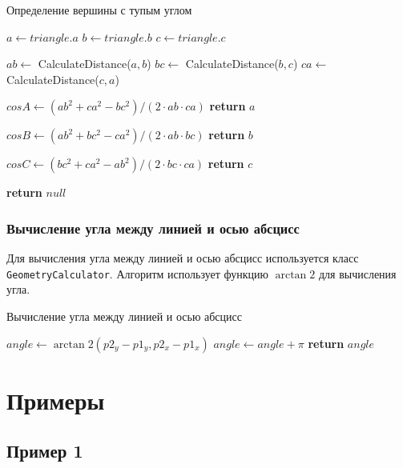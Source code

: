\documentclass[a4paper,12pt]{article}
\begin{document}
\begin{algorithm}
\caption{Определение вершины с тупым углом}
\begin{algorithmic}[1]
    \State $a \gets triangle.a$
    \State $b \gets triangle.b$
    \State $c \gets triangle.c$
    
    \State $ab \gets$ CalculateDistance($a, b$)
    \State $bc \gets$ CalculateDistance($b, c$)
    \State $ca \gets$ CalculateDistance($c, a$)
    
    \State $cosA \gets (ab^2 + ca^2 - bc^2) / (2 \cdot ab \cdot ca)$
        \State \textbf{return} $a$
    \EndIf
    
    \State $cosB \gets (ab^2 + bc^2 - ca^2) / (2 \cdot ab \cdot bc)$
        \State \textbf{return} $b$
    \EndIf
    
    \State $cosC \gets (bc^2 + ca^2 - ab^2) / (2 \cdot bc \cdot ca)$
        \State \textbf{return} $c$
    \EndIf
    
    \State \textbf{return} $null$
\EndProcedure
\end{algorithmic}
\end{algorithm}

\subsubsection{Вычисление угла между линией и осью абсцисс}

Для вычисления угла между линией и осью абсцисс используется класс \texttt{GeometryCalculator}. Алгоритм использует функцию $\arctan2$ для вычисления угла.

\begin{algorithm}
\caption{Вычисление угла между линией и осью абсцисс}
\begin{algorithmic}[1]
    \State $angle \gets \arctan2(p2_y - p1_y, p2_x - p1_x)$
        \State $angle \gets angle + \pi$
    \EndIf
    \State \textbf{return} $angle$
\EndProcedure
\end{algorithmic}
\end{algorithm}

\section{Примеры}

\subsection{Пример 1}
\end{document}
